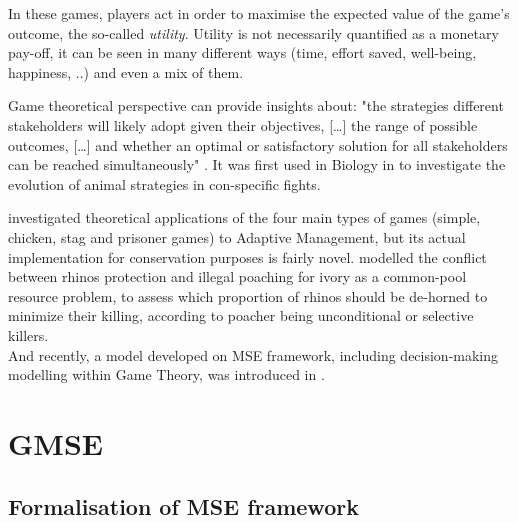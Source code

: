 \documentclass[12pt,a4paper]{article}
\begin{document}
In these games, players act in order to maximise the expected value of the game's outcome, the so-called \textit{utility}.
Utility is not necessarily quantified as a monetary pay-off, it can be seen in many different ways (time, effort saved, well-being, happiness, ..) and even a mix of them.

Game theoretical perspective can provide insights about: "the strategies different stakeholders will likely adopt given their objectives, [\dots] the range of possible outcomes, [\dots] and whether an optimal or satisfactory solution for all stakeholders can be reached simultaneously" \citep{COLYVAN20111246}.
It was first used in Biology in \cite{maynard1973logic} to investigate the evolution of animal strategies in con-specific fights.

\cite{COLYVAN20111246} investigated theoretical applications of the four main types of games (simple, chicken, stag and prisoner games) to Adaptive Management, but its actual implementation for conservation purposes is fairly novel. 
\cite{glynatsi2018evolutionary} modelled the conflict between rhinos protection and illegal poaching for ivory as a common-pool resource problem, to assess which proportion of rhinos should be de-horned to minimize their killing, according to poacher being unconditional or selective killers.\\ %
And recently, a model developed on MSE framework, including decision-making modelling within Game Theory, was introduced in \cite{duthie2018} .

\section{GMSE}%

\subsection{Formalisation of MSE framework}
\end{document}
